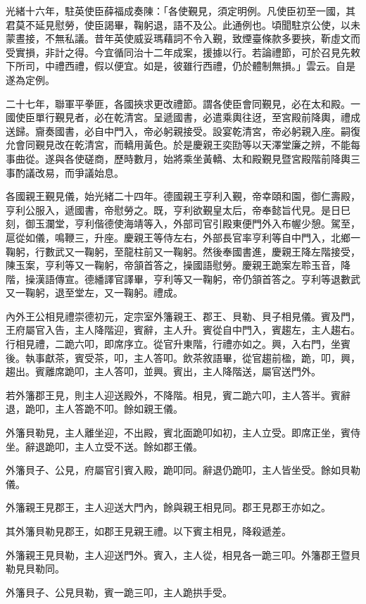 \begin{pinyinscope}
光緒十六年，駐英使臣薛福成奏陳：「各使覲見，須定明例。凡使臣初至一國，其君莫不延見慰勞，使臣謁畢，鞠躬退，語不及公。此通例也。頃聞駐京公使，以未蒙晝接，不無私議。昔年英使威妥瑪藉詞不令入覲，致煙臺條款多要挾，靳虛文而受實損，非計之得。今宜循同治十二年成案，援據以行。若論禮節，可於召見先敕下所司，中禮西禮，假以便宜。如是，彼雖行西禮，仍於體制無損。」雲云。自是遂為定例。

二十七年，聯軍平拳匪，各國挾求更改禮節。謂各使臣會同覲見，必在太和殿。一國使臣單行覲見者，必在乾清宮。呈遞國書，必遣乘輿往迓，至宮殿前降輿，禮成送歸。齎奏國書，必自中門入，帝必躬親接受。設宴乾清宮，帝必躬親入座。嗣復允會同覲見改在乾清宮，而轎用黃色。於是慶親王奕劻等以天澤堂廉之辨，不能每事曲從。遂與各使磋商，歷時數月，始將乘坐黃轎、太和殿覲見暨宮殿階前降輿三事酌議改易，而爭議始息。

各國親王覲見儀，始光緒二十四年。德國親王亨利入覲，帝幸頤和園，御仁壽殿，亨利公服入，遞國書，帝慰勞之。既，亨利欲覲皇太后，帝奉懿旨代見。是日巳刻，御玉瀾堂，亨利偕德使海靖等入，外部司官引殿東便門外入布幄少憩。駕至，扈從如儀，鳴鞭三，升座。慶親王等侍左右，外部長官率亨利等自中門入，北鄉一鞠躬，行數武又一鞠躬，至龍柱前又一鞠躬。然後奉國書進，慶親王降左階接受，陳玉案，亨利等又一鞠躬，帝頷首答之，操國語慰勞。慶親王跪案左聆玉音，降階，操漢語傳宣。德繙譯官譯畢，亨利等又一鞠躬，帝仍頷首答之。亨利等退數武又一鞠躬，退至堂左，又一鞠躬。禮成。

內外王公相見禮崇德初元，定宗室外籓親王、郡王、貝勒、貝子相見儀。賓及門，王府屬官入告，主人降階迎，賓辭，主人升。賓從自中門入，賓趨左，主人趨右。行相見禮，二跪六叩，即席序立。從官升東階，行禮亦如之。興，入右門，坐賓後。執事獻茶，賓受茶，叩，主人答叩。飲茶敘語畢，從官趨前楹，跪，叩，興，趨出。賓離席跪叩，主人答叩，並興。賓出，主人降階送，屬官送門外。

若外籓郡王見，則主人迎送殿外，不降階。相見，賓二跪六叩，主人答半。賓辭退，跪叩，主人答跪不叩。餘如親王儀。

外籓貝勒見，主人離坐迎，不出殿，賓北面跪叩如初，主人立受。即席正坐，賓侍坐。辭退跪叩，主人立受不送。餘如郡王儀。

外籓貝子、公見，府屬官引賓入殿，跪叩同。辭退仍跪叩，主人皆坐受。餘如貝勒儀。

外籓親王見郡王，主人迎送大門內，餘與親王相見同。郡王見郡王亦如之。

其外籓貝勒見郡王，如郡王見親王禮。以下賓主相見，降殺遞差。

外籓親王見貝勒，主人迎送門外。賓入，主人從，相見各一跪三叩。外籓郡王暨貝勒見貝勒同。

外籓貝子、公見貝勒，賓一跪三叩，主人跪拱手受。


\end{pinyinscope}
